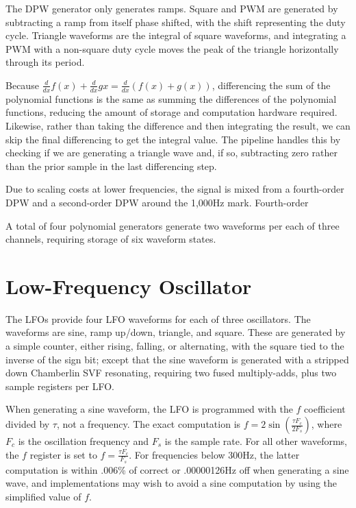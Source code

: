 The DPW generator only generates ramps.  Square and PWM are generated by subtracting a ramp from itself phase shifted, with the shift representing the duty cycle.  Triangle waveforms are the integral of square waveforms, and integrating a PWM with a non-square duty cycle moves the peak of the triangle horizontally through its period.

Because $\frac{d}{dx}f(x)+\frac{d}{dx}g{x}=\frac{d}{dx}(f(x)+g(x))$, differencing the sum of the polynomial functions is the same as summing the differences of the polynomial functions, reducing the amount of storage and computation hardware required.  Likewise, rather than taking the difference and then integrating the result, we can skip the final differencing to get the integral value.  The pipeline handles this by checking if we are generating a triangle wave and, if so, subtracting zero rather than the prior sample in the last differencing step.

Due to scaling costs at lower frequencies, the signal is mixed from a fourth-order DPW and a second-order DPW around the 1,000Hz mark.  Fourth-order

A total of four polynomial generators generate two waveforms per each of three channels, requiring storage of six waveform states.


\section{Low-Frequency Oscillator}

The LFOs provide four LFO waveforms for each of three oscillators.  The waveforms are sine, ramp up/down, triangle, and square.  These are generated by a simple counter, either rising, falling, or alternating, with the square tied to the inverse of the sign bit; except that the sine waveform is generated with a stripped down Chamberlin SVF resonating, requiring two fused multiply-adds,  plus two sample registers per LFO.

When generating a sine waveform, the LFO is programmed with the $f$ coefficient divided by $\tau$, not a frequency.  The exact computation is $f=2\sin\left(\frac{\tau F_c}{2F_s}\right)$, where $F_c$ is the oscillation frequency and $F_s$ is the sample rate.  For all other waveforms, the $f$ register is set to $f=\frac{\tau F_c}{F_s}$.  For frequencies below 300Hz, the latter computation is within .006\% of correct or .00000126Hz off when generating a sine wave, and implementations may wish to avoid a sine computation by using the simplified value of $f$.

